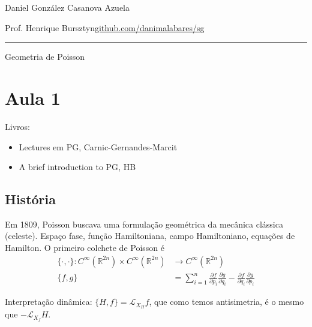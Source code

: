 
\newcommand{\rightlooparrow}{\mathbin{
    \vbox{\openup-10.25pt\halign{\hss$##$\hss\cr\circ\cr\longrightarrow\cr}}
}}




\begin{minipage}{\textwidth}
	\begin{minipage}{1\textwidth}
		\hfill Daniel González Casanova Azuela
		
		{\small Prof. Henrique Bursztyn\hfill\href{https://github.com/danimalabares/sg}{github.com/danimalabares/sg}}
	\end{minipage}
\end{minipage}\vspace{.2cm}\hrule

\vspace{10pt}
{\huge Geometria de Poisson}
\tableofcontents
\section{Aula 1}

Livros:
\begin{itemize}
\item Lectures em PG, Carnic-Gernandes-Marcit
\item A brief introduction to PG, HB
\end{itemize}

\subsection{História}

Em 1809, Poisson buscava uma formulação geométrica da mecânica clássica (celeste). Espaço fase, função Hamiltoniana, campo Hamiltoniano, equações de Hamilton. O primeiro colchete de Poisson é
\begin{align*}
	\{\cdot ,\cdot \}: C^\infty(\mathbb{R}^{2n})\times C^\infty(\mathbb{R}^{2n}) &\longrightarrow C^\infty(\mathbb{R}^{2n}) \\
	\{f,g\} &=\sum_{i=1}^n \frac{\partial f}{\partial p_i}\frac{\partial g}{\partial q_i}-\frac{\partial f}{\partial q_i}\frac{\partial g}{\partial p_i}
\end{align*}

Interpretação dinâmica: \(\{H,f\}=\mathcal{L}_{X_H}f\), que como temos antisimetria, é o mesmo que \(-\mathcal{L}_{X_f}H\).

